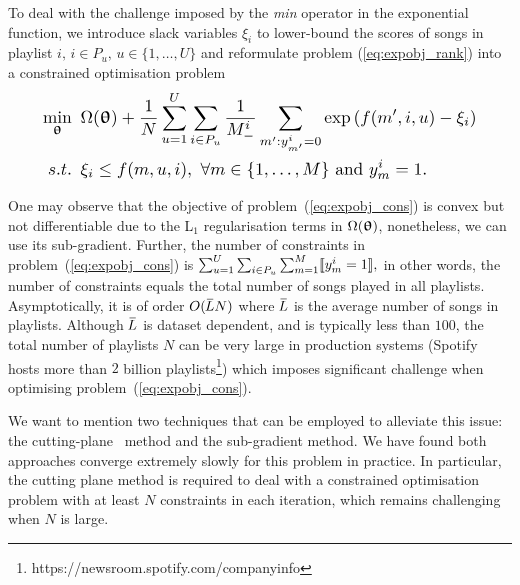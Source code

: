 To deal with the challenge imposed by the \emph{min} operator in the exponential function, 
we introduce slack variables $\xi_i$ to lower-bound the scores of songs in playlist $i, \, i \in P_u, \, u \in \{1,\dots,U\}$ 
and 
reformulate problem (\ref{eq:expobj_rank}) into a constrained optimisation problem %
\begin{equation}
\label{eq:expobj_cons}
\resizebox{.9\linewidth}{!}{$\displaystyle
\begin{aligned}
\min_{\upthetabm} \ \, & 
\Omega(\upthetabm) + \frac{1}{N} \sum_{u=1}^U \sum_{i \in P_u} \frac{1}{M_-^i} \sum_{m': y_{m'}^i = 0} \exp \left( f(m', i, u) - \xi_i \right) \\
s.t. \ \, & 
\xi_i \le f(m, u, i), \ \forall m \in \{1,\dots,M\} \ \text{and} \ y_m^i = 1.
\end{aligned}
$}
\end{equation}

One may observe that the objective of problem~(\ref{eq:expobj_cons}) is convex but not differentiable due to 
the L$_1$ regularisation terms in $\Omega({\bm{\uptheta}})$, nonetheless, we can use its sub-gradient.
Further, the number of constraints in problem~(\ref{eq:expobj_cons}) is
$
\sum_{u=1}^U \sum_{i \in P_u} \sum_{m=1}^M \llbracket y_m^i = 1 \rrbracket,
$
in other words, the number of constraints equals the total number of songs played in all playlists.
Asymptotically, it is of order $O(\widebar{L} N)$ where $\widebar{L}$ is the average number of songs in playlists.
Although $\widebar{L}$ is dataset dependent, and is typically less than $100$,
the total number of playlists $N$ can be very large in production systems 
(\eg Spotify hosts more than $2$ billion playlists\footnote{https://newsroom.spotify.com/companyinfo})
which imposes significant challenge when optimising problem~(\ref{eq:expobj_cons}).

We want to mention two techniques that can be employed to alleviate this issue:
the cutting-plane~\cite{avriel2003nonlinear} method and the sub-gradient method.
We have found both approaches converge extremely slowly for this problem in practice.
In particular, the cutting plane method is required to deal with a constrained optimisation problem 
with at least $N$ constraints in each iteration, which remains challenging when $N$ is large.

